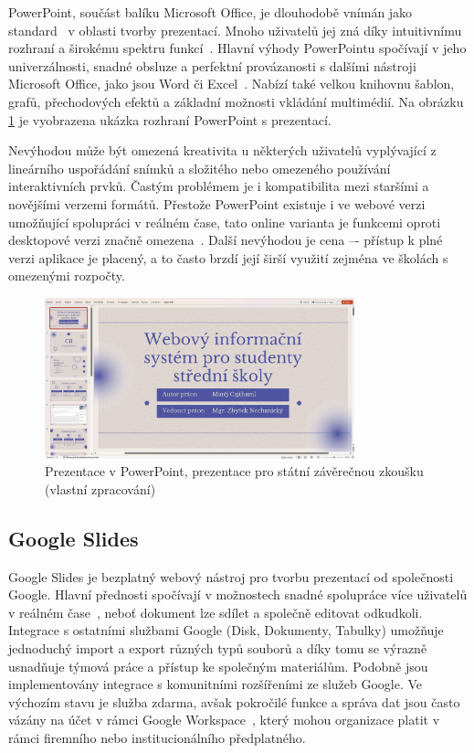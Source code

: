 PowerPoint, součást balíku Microsoft Office, je dlouhodobě vnímán jako standard~\cite{pp_usage} v oblasti tvorby prezentací.
Mnoho uživatelů jej zná díky intuitivnímu rozhraní a širokému spektru funkcí~\cite{pp_usage}.
Hlavní výhody PowerPointu spočívají v jeho univerzálnosti, snadné obsluze a perfektní provázanosti s dalšími nástroji Microsoft Office, jako jsou Word či Excel~\cite{pp_excel, pp_word}.
Nabízí také velkou knihovnu šablon, grafů, přechodových efektů a základní možnosti vkládání multimédií.
Na obrázku \ref{fig:analyza/powerpoint} je vyobrazena ukázka rozhraní PowerPoint s prezentací. 

Nevýhodou může být omezená kreativita u některých uživatelů vyplývající z lineárního uspořádání snímků a složitého nebo omezeného používání interaktivních prvků. 
Častým problémem je i kompatibilita mezi staršími a novějšími verzemi formátů.
Přestože PowerPoint existuje i ve webové verzi umožňující spolupráci v reálném čase, tato online varianta je funkcemi oproti desktopové verzi značně omezena~\cite{pp_platforms}.
Další nevýhodou je cena –- přístup k plné verzi aplikace je placený, a to často brzdí její širší využití zejména ve školách s omezenými rozpočty.

\begin{figure}[ht!]
    \centering
    \includegraphics[width=0.8\textwidth]{media/03_analyza/powerpoint.png}
    \caption[Prezentace v PowerPoint, prezentace pro státní závěrečnou zkoušku]{Prezentace v PowerPoint, prezentace pro státní závěrečnou zkoušku (vlastní zpracování)}
    \label{fig:analyza/powerpoint}
\end{figure}


\subsection{Google Slides}\label{text:google_slides}

Google Slides je bezplatný webový nástroj pro tvorbu prezentací od společnosti Google. 
Hlavní přednosti spočívají v možnostech snadné spolupráce více uživatelů v reálném čase~\cite{slides}, neboť dokument lze sdílet a společně editovat odkudkoli.
Integrace s ostatními službami Google (Disk, Dokumenty, Tabulky) umožňuje jednoduchý import a export různých typů souborů a díky tomu se výrazně usnadňuje týmová práce a přístup ke společným materiálům. 
Podobně jsou implementovány integrace s komunitními rozšířeními ze služeb Google.
Ve výchozím stavu je služba zdarma, avšak pokročilé funkce a správa dat jsou často vázány na účet v rámci Google Workspace~\cite{slides}, který mohou organizace platit v rámci firemního nebo institucionálního předplatného. 

